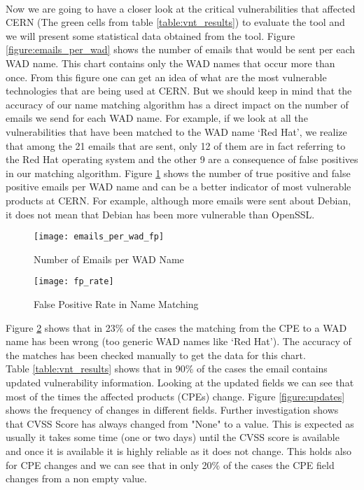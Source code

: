 \paragraph{}
Now we are going to have a closer look at the critical vulnerabilities that affected CERN (The green cells from table \ref{table:vnt_results}) to evaluate the tool and we will present some statistical data obtained from the tool.
Figure \ref{figure:emails_per_wad} shows the number of emails that would be sent per each WAD name. This chart contains only the WAD names that occur more than once. From this figure one can get an idea of what are the most vulnerable technologies that are being used at CERN. But we should keep in mind that the accuracy of our name matching algorithm has a direct impact on the number of emails we send for each WAD name. For example, if we look at all the vulnerabilities that have been matched to the WAD name `Red Hat', we realize that among the 21 emails that are sent, only 12 of them are in fact referring to the Red Hat operating system and the  other 9 are a consequence of false positives in our matching algorithm. Figure \ref{figure:emails_per_wad_fp} shows the number of true positive and false positive emails per WAD name and can be a better indicator of most vulnerable products at CERN. For example, although more emails were sent about Debian, it does not mean that Debian has been more vulnerable than OpenSSL.
\\
\begin{figure}[h!]
\label{figure:emails_per_wad_fp}
  \centering
    \texttt{[image: emails\_per\_wad\_fp]}
  \caption{Number of Emails per WAD Name}
\end{figure}


\begin{figure}[h!]
\label{figure:fp_rate}
  \centering
    \texttt{[image: fp\_rate]}
  \caption{False Positive Rate in Name Matching}
\end{figure}


Figure \ref{figure:fp_rate} shows that in 23\% of the cases the matching from the CPE to a WAD name has been wrong (too generic WAD names like `Red Hat'). The accuracy of the matches has been checked manually to get the data for this chart.
\\
Table \ref{table:vnt_results} shows that in 90\%  of the cases the email contains updated vulnerability information. Looking at the updated fields we can see that most of the times the affected products (CPEs) change. Figure \ref{figure:updates} shows the frequency of changes in different fields. Further investigation shows that CVSS Score has always changed from "None" to a value. This is expected as usually it takes some time (one or two days) until the CVSS score is available and once it is available it is highly reliable as it does not change. This holds also for CPE changes and we can see that in only 20\% of the cases the CPE field changes from a non empty value.




